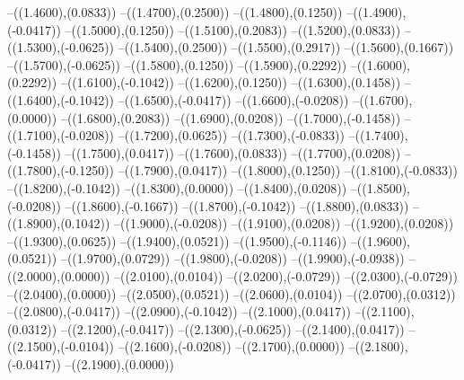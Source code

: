 {	--({\sx*(1.4600)},{\sy*(0.0833)})
	--({\sx*(1.4700)},{\sy*(0.2500)})
	--({\sx*(1.4800)},{\sy*(0.1250)})
	--({\sx*(1.4900)},{\sy*(-0.0417)})
	--({\sx*(1.5000)},{\sy*(0.1250)})
	--({\sx*(1.5100)},{\sy*(0.2083)})
	--({\sx*(1.5200)},{\sy*(0.0833)})
	--({\sx*(1.5300)},{\sy*(-0.0625)})
	--({\sx*(1.5400)},{\sy*(0.2500)})
	--({\sx*(1.5500)},{\sy*(0.2917)})
	--({\sx*(1.5600)},{\sy*(0.1667)})
	--({\sx*(1.5700)},{\sy*(-0.0625)})
	--({\sx*(1.5800)},{\sy*(0.1250)})
	--({\sx*(1.5900)},{\sy*(0.2292)})
	--({\sx*(1.6000)},{\sy*(0.2292)})
	--({\sx*(1.6100)},{\sy*(-0.1042)})
	--({\sx*(1.6200)},{\sy*(0.1250)})
	--({\sx*(1.6300)},{\sy*(0.1458)})
	--({\sx*(1.6400)},{\sy*(-0.1042)})
	--({\sx*(1.6500)},{\sy*(-0.0417)})
	--({\sx*(1.6600)},{\sy*(-0.0208)})
	--({\sx*(1.6700)},{\sy*(0.0000)})
	--({\sx*(1.6800)},{\sy*(0.2083)})
	--({\sx*(1.6900)},{\sy*(0.0208)})
	--({\sx*(1.7000)},{\sy*(-0.1458)})
	--({\sx*(1.7100)},{\sy*(-0.0208)})
	--({\sx*(1.7200)},{\sy*(0.0625)})
	--({\sx*(1.7300)},{\sy*(-0.0833)})
	--({\sx*(1.7400)},{\sy*(-0.1458)})
	--({\sx*(1.7500)},{\sy*(0.0417)})
	--({\sx*(1.7600)},{\sy*(0.0833)})
	--({\sx*(1.7700)},{\sy*(0.0208)})
	--({\sx*(1.7800)},{\sy*(-0.1250)})
	--({\sx*(1.7900)},{\sy*(0.0417)})
	--({\sx*(1.8000)},{\sy*(0.1250)})
	--({\sx*(1.8100)},{\sy*(-0.0833)})
	--({\sx*(1.8200)},{\sy*(-0.1042)})
	--({\sx*(1.8300)},{\sy*(0.0000)})
	--({\sx*(1.8400)},{\sy*(0.0208)})
	--({\sx*(1.8500)},{\sy*(-0.0208)})
	--({\sx*(1.8600)},{\sy*(-0.1667)})
	--({\sx*(1.8700)},{\sy*(-0.1042)})
	--({\sx*(1.8800)},{\sy*(0.0833)})
	--({\sx*(1.8900)},{\sy*(0.1042)})
	--({\sx*(1.9000)},{\sy*(-0.0208)})
	--({\sx*(1.9100)},{\sy*(0.0208)})
	--({\sx*(1.9200)},{\sy*(0.0208)})
	--({\sx*(1.9300)},{\sy*(0.0625)})
	--({\sx*(1.9400)},{\sy*(0.0521)})
	--({\sx*(1.9500)},{\sy*(-0.1146)})
	--({\sx*(1.9600)},{\sy*(0.0521)})
	--({\sx*(1.9700)},{\sy*(0.0729)})
	--({\sx*(1.9800)},{\sy*(-0.0208)})
	--({\sx*(1.9900)},{\sy*(-0.0938)})
	--({\sx*(2.0000)},{\sy*(0.0000)})
	--({\sx*(2.0100)},{\sy*(0.0104)})
	--({\sx*(2.0200)},{\sy*(-0.0729)})
	--({\sx*(2.0300)},{\sy*(-0.0729)})
	--({\sx*(2.0400)},{\sy*(0.0000)})
	--({\sx*(2.0500)},{\sy*(0.0521)})
	--({\sx*(2.0600)},{\sy*(0.0104)})
	--({\sx*(2.0700)},{\sy*(0.0312)})
	--({\sx*(2.0800)},{\sy*(-0.0417)})
	--({\sx*(2.0900)},{\sy*(-0.1042)})
	--({\sx*(2.1000)},{\sy*(0.0417)})
	--({\sx*(2.1100)},{\sy*(0.0312)})
	--({\sx*(2.1200)},{\sy*(-0.0417)})
	--({\sx*(2.1300)},{\sy*(-0.0625)})
	--({\sx*(2.1400)},{\sy*(0.0417)})
	--({\sx*(2.1500)},{\sy*(-0.0104)})
	--({\sx*(2.1600)},{\sy*(-0.0208)})
	--({\sx*(2.1700)},{\sy*(0.0000)})
	--({\sx*(2.1800)},{\sy*(-0.0417)})
	--({\sx*(2.1900)},{\sy*(0.0000)})
}
